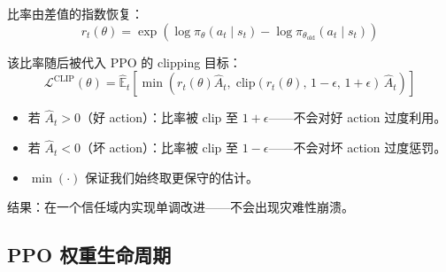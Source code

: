 比率由差值的指数恢复：
\begin{equation}
\boxed{r_t(\theta) = \exp\!\left(\log \pi_\theta(a_t \mid s_t) - \log \pi_{\theta_{\text{old}}}(a_t \mid s_t)\right)}
\end{equation}

该比率随后被代入 PPO 的 clipping 目标：
\begin{equation}
\boxed{\mathcal{L}^{\text{CLIP}}(\theta) = \hat{\mathbb{E}}_t \left[ \min\!\left(r_t(\theta)\hat{A}_t, \;\text{clip}(r_t(\theta),\, 1{-}\epsilon,\, 1{+}\epsilon)\,\hat{A}_t\right) \right]}
\end{equation}

\begin{intuitionbox}
\begin{itemize}
  \item 若 $\hat{A}_t > 0$（好 action）：比率被 clip 至 $1+\epsilon$——不会对好 action 过度利用。
  \item 若 $\hat{A}_t < 0$（坏 action）：比率被 clip 至 $1-\epsilon$——不会对坏 action 过度惩罚。
  \item $\min(\cdot)$ 保证我们始终取更保守的估计。
\end{itemize}

结果：在一个信任域内实现单调改进——不会出现灾难性崩溃。
\end{intuitionbox}

\subsection{PPO 权重生命周期}
\label{the-ppo-weight-lifecycle}


